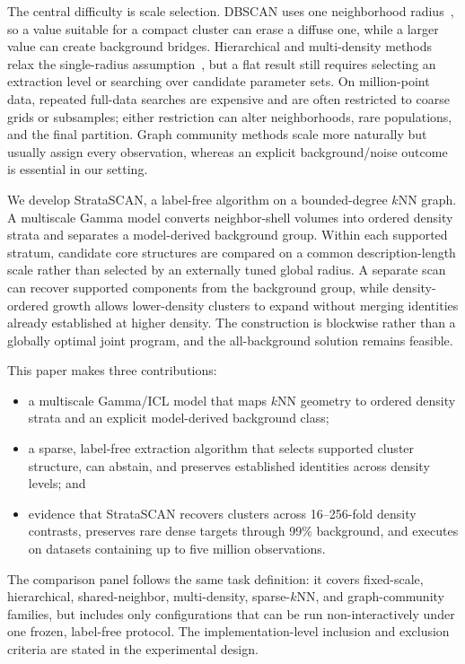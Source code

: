 \documentclass[conference]{IEEEtran}
\newcommand{\method}{StrataSCAN}
\begin{document}
The central difficulty is scale selection. DBSCAN uses one neighborhood radius~\cite{ester1996dbscan}, so a value suitable for a compact cluster can erase a diffuse one, while a larger value can create background bridges. Hierarchical and multi-density methods relax the single-radius assumption~\cite{ankerst1999optics,campello2013hdbscan,liu2007vdbscan,wang2022amd}, but a flat result still requires selecting an extraction level or searching over candidate parameter sets. On million-point data, repeated full-data searches are expensive and are often restricted to coarse grids or subsamples; either restriction can alter neighborhoods, rare populations, and the final partition. Graph community methods scale more naturally but usually assign every observation, whereas an explicit background/noise outcome is essential in our setting.

We develop \method, a label-free algorithm on a bounded-degree $k$NN graph. A multiscale Gamma model converts neighbor-shell volumes into ordered density strata and separates a model-derived background group. Within each supported stratum, candidate core structures are compared on a common description-length scale rather than selected by an externally tuned global radius. A separate scan can recover supported components from the background group, while density-ordered growth allows lower-density clusters to expand without merging identities already established at higher density. The construction is blockwise rather than a globally optimal joint program, and the all-background solution remains feasible.

This paper makes three contributions:
\begin{itemize}
  \item a multiscale Gamma/ICL model that maps $k$NN geometry to ordered density strata and an explicit model-derived background class;
  \item a sparse, label-free extraction algorithm that selects supported cluster structure, can abstain, and preserves established identities across density levels; and
  \item evidence that \method{} recovers clusters across 16--256-fold density contrasts, preserves rare dense targets through 99\% background, and executes on datasets containing up to five million observations.
\end{itemize}

The comparison panel follows the same task definition: it covers fixed-scale, hierarchical, shared-neighbor, multi-density, sparse-$k$NN, and graph-community families, but includes only configurations that can be run non-interactively under one frozen, label-free protocol. The implementation-level inclusion and exclusion criteria are stated in the experimental design.
\end{document}
